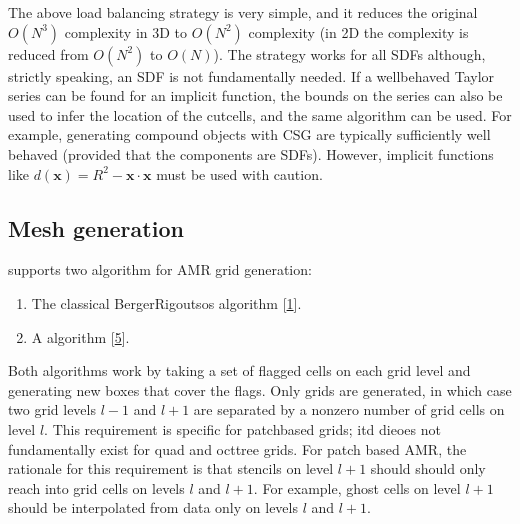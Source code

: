 \documentclass[letterpaper,10pt,english]{sphinxmanual}
\begin{document}
\sphinxAtStartPar
The above load balancing strategy is very simple, and it reduces the original \(O(N^3)\) complexity in 3D to \(O(N^2)\) complexity (in 2D the complexity is reduced from \(O(N^2)\) to \(O(N)\)).
The strategy works for all SDFs although, strictly speaking, an SDF is not fundamentally needed.
If a well\sphinxhyphen{}behaved Taylor series can be found for an implicit function, the bounds on the series can also be used to infer the location of the cut\sphinxhyphen{}cells, and the same algorithm can be used.
For example, generating compound objects with CSG are typically sufficiently well behaved (provided that the components are SDFs).
However, implicit functions like \(d\left(\mathbf{x}\right) = R^2 - \mathbf{x}\cdot\mathbf{x}\) must be used with caution.


\subsection{Mesh generation}
\label{\detokenize{Source/SpatialDiscretization:mesh-generation}}\label{\detokenize{Source/SpatialDiscretization:chap-meshgeneration}}
\sphinxAtStartPar
{} supports two algorithm for AMR grid generation:
\begin{enumerate}
%
\item {} 
\sphinxAtStartPar
The classical Berger\sphinxhyphen{}Rigoutsos algorithm {[}\hyperlink{cite.ZZReferences:id38}{1}{]}.

\item {} 
\sphinxAtStartPar
A  algorithm {[}\hyperlink{cite.ZZReferences:id164}{5}{]}.

\end{enumerate}

\sphinxAtStartPar
Both algorithms work by taking a set of flagged cells on each grid level and generating new boxes that cover the flags.
Only  grids are generated, in which case two grid levels \(l-1\) and \(l+1\) are separated by a non\sphinxhyphen{}zero number of grid cells on level \(l\).
This requirement is specific for patch\sphinxhyphen{}based grids; itd dieoes not fundamentally exist for quad\sphinxhyphen{} and oct\sphinxhyphen{}tree grids.
For patch based AMR, the rationale for this requirement is that stencils on level \(l+1\) should should only reach into grid cells on levels \(l\) and \(l+1\).
For example, ghost cells on level \(l+1\) should be interpolated from data only on levels \(l\) and \(l+1\).
\end{document}
